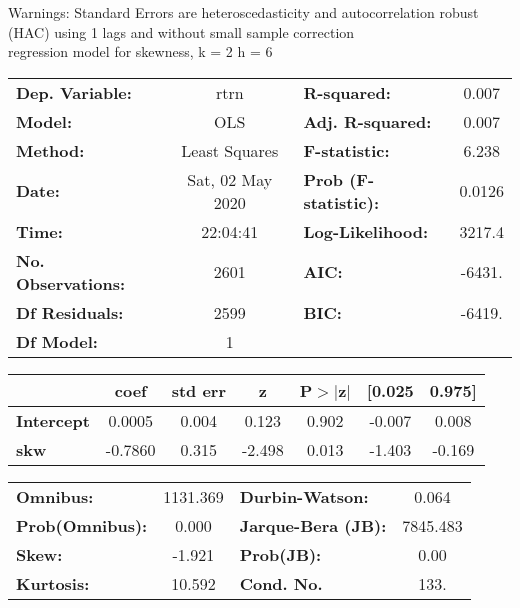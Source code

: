 Warnings: \newline
 [1] Standard Errors are heteroscedasticity and autocorrelation robust (HAC) using 1 lags and without small sample correction\\ 

regression model for skewness, k = 2 h = 6\begin{center}
\begin{tabular}{lclc}
\toprule
\textbf{Dep. Variable:}    &       rtrn       & \textbf{  R-squared:         } &     0.007   \\
\textbf{Model:}            &       OLS        & \textbf{  Adj. R-squared:    } &     0.007   \\
\textbf{Method:}           &  Least Squares   & \textbf{  F-statistic:       } &     6.238   \\
\textbf{Date:}             & Sat, 02 May 2020 & \textbf{  Prob (F-statistic):} &   0.0126    \\
\textbf{Time:}             &     22:04:41     & \textbf{  Log-Likelihood:    } &    3217.4   \\
\textbf{No. Observations:} &        2601      & \textbf{  AIC:               } &    -6431.   \\
\textbf{Df Residuals:}     &        2599      & \textbf{  BIC:               } &    -6419.   \\
\textbf{Df Model:}         &           1      & \textbf{                     } &             \\
\bottomrule
\end{tabular}
\begin{tabular}{lcccccc}
                   & \textbf{coef} & \textbf{std err} & \textbf{z} & \textbf{P$> |$z$|$} & \textbf{[0.025} & \textbf{0.975]}  \\
\midrule
\textbf{Intercept} &       0.0005  &        0.004     &     0.123  &         0.902        &       -0.007    &        0.008     \\
\textbf{skw}       &      -0.7860  &        0.315     &    -2.498  &         0.013        &       -1.403    &       -0.169     \\
\bottomrule
\end{tabular}
\begin{tabular}{lclc}
\textbf{Omnibus:}       & 1131.369 & \textbf{  Durbin-Watson:     } &    0.064  \\
\textbf{Prob(Omnibus):} &   0.000  & \textbf{  Jarque-Bera (JB):  } & 7845.483  \\
\textbf{Skew:}          &  -1.921  & \textbf{  Prob(JB):          } &     0.00  \\
\textbf{Kurtosis:}      &  10.592  & \textbf{  Cond. No.          } &     133.  \\
\bottomrule
\end{tabular}
\end{center}


